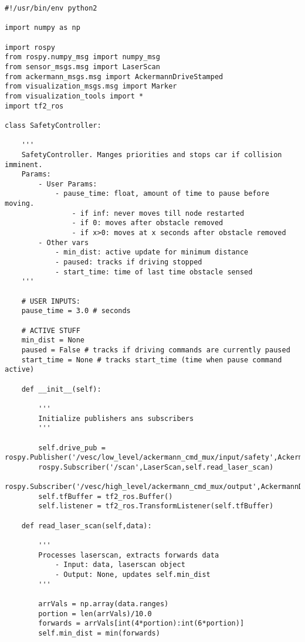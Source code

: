 \documentclass{article}
\begin{document}
{\footnotesize
\begin{verbatim}
#!/usr/bin/env python2

import numpy as np

import rospy
from rospy.numpy_msg import numpy_msg
from sensor_msgs.msg import LaserScan
from ackermann_msgs.msg import AckermannDriveStamped
from visualization_msgs.msg import Marker
from visualization_tools import *
import tf2_ros

class SafetyController:
    
    '''
    SafetyController. Manges priorities and stops car if collision imminent. 
    Params:
        - User Params:
            - pause_time: float, amount of time to pause before moving.
                - if inf: never moves till node restarted
                - if 0: moves after obstacle removed
                - if x>0: moves at x seconds after obstacle removed
        - Other vars
            - min_dist: active update for minimum distance
            - paused: tracks if driving stopped
            - start_time: time of last time obstacle sensed
    '''

    # USER INPUTS:
    pause_time = 3.0 # seconds

    # ACTIVE STUFF
    min_dist = None 
    paused = False # tracks if driving commands are currently paused
    start_time = None # tracks start_time (time when pause command active)

    def __init__(self):
        
        '''
        Initialize publishers ans subscribers
        '''
        
        self.drive_pub = rospy.Publisher('/vesc/low_level/ackermann_cmd_mux/input/safety',AckermannDriveStamped,queue_size=10)
        rospy.Subscriber('/scan',LaserScan,self.read_laser_scan)
        rospy.Subscriber('/vesc/high_level/ackermann_cmd_mux/output',AckermannDriveStamped,self.check_drive_command)
        self.tfBuffer = tf2_ros.Buffer()
        self.listener = tf2_ros.TransformListener(self.tfBuffer)

    def read_laser_scan(self,data):

        '''
        Processes laserscan, extracts forwards data
            - Input: data, laserscan object
            - Output: None, updates self.min_dist 
        '''

        arrVals = np.array(data.ranges)
        portion = len(arrVals)/10.0
        forwards = arrVals[int(4*portion):int(6*portion)]
        self.min_dist = min(forwards)
    

\end{verbatim}}
\end{document}
